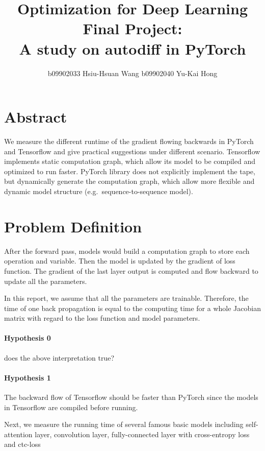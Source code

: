 \documentclass[14pt,twocolumn,letterpaper]{extarticle}
\begin{document}
\title{Optimization for Deep Learning Final Project: \\
A study on autodiff in PyTorch}
\author{b09902033 Hsiu-Hsuan Wang\; b09902040 Yu-Kai Hong}
\date{}
\maketitle

\section{Abstract}

We measure the different runtime of the gradient flowing backwards in PyTorch and Tensorflow and give practical suggestions under different scenario. Tensorflow implements static computation graph, which allow its model to be compiled and optimized to run faster. PyTorch library does not explicitly implement the tape, but dynamically generate the computation graph, which allow more flexible and dynamic model structure (e.g.\ sequence-to-sequence model).

\section{Problem Definition}

After the forward pass, models would build a computation graph to store each operation and variable. Then the model is updated by the gradient of loss function. The gradient of the last layer output is computed and flow backward to update all the parameters.

In this report, we assume that all the parameters are trainable. Therefore, the time of one back propagation is equal to the computing time for a whole Jacobian matrix with regard to the loss function and model parameters.

\paragraph*{Hypothesis 0}
does the above interpretation true?

\paragraph*{Hypothesis 1}
The backward flow of Tensorflow should be faster than PyTorch since the models in Tensorflow are compiled before running.

Next, we measure the running time of several famous basic models including self-attention layer, convolution layer, fully-connected layer with cross-entropy loss and ctc-loss
\end{document}
